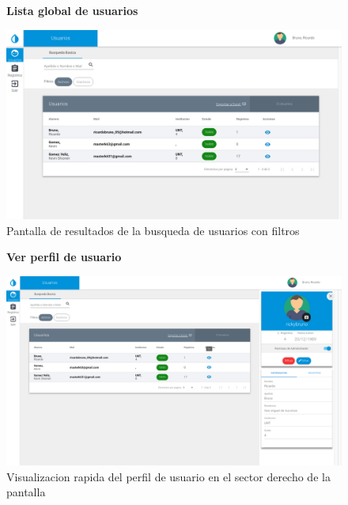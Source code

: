 				\begin{figure}[H]
					\hspace*{1cm}\raggedright\large\textbf{Lista global de usuarios}\par\medskip
					\centering
						\includegraphics[width=1\textwidth]{Screenshots/web/usuarioListar.png}
							\caption{Pantalla de resultados de la busqueda de usuarios con filtros}
				\end{figure}

			
				\begin{figure}[H]
					\hspace*{1cm}\raggedright\large\textbf{Ver perfil de usuario}\par\medskip
					\centering
						\includegraphics[width=1\textwidth]{Screenshots/web/usuarioVer.png}
							\caption{Visualizacion rapida del perfil de usuario en el sector derecho de la pantalla}
				\end{figure}
